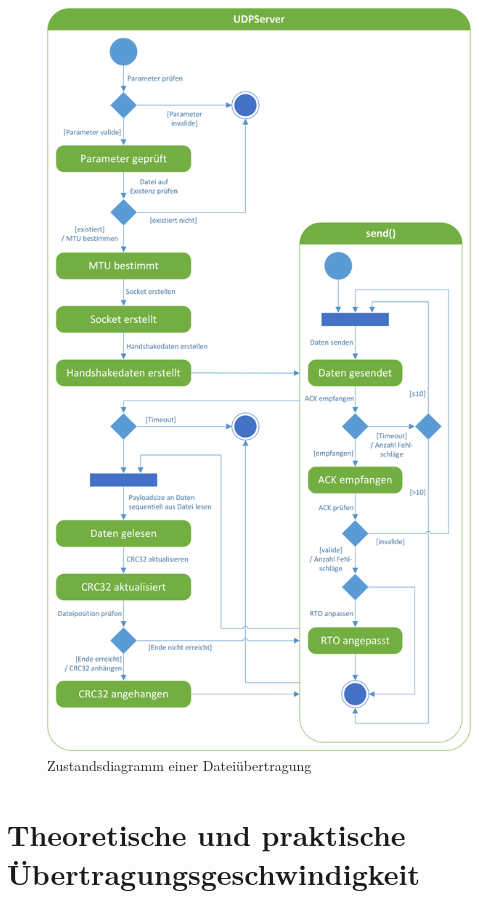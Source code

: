 \begin{figure}
	\centering
	\includegraphics[width=\textwidth,height=\textheight,keepaspectratio]{assets/UDPClient.png}
	\caption{Zustandsdiagramm einer Dateiübertragung}
\end{figure}

\chapter{Theoretische und praktische Übertragungsgeschwindigkeit}


